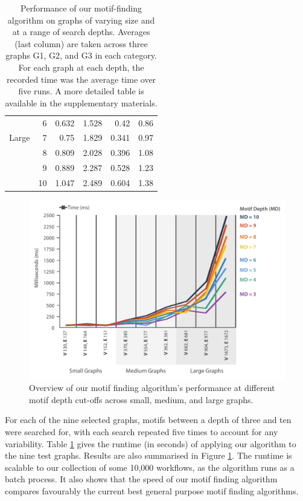 \begin{table}[t!]
{\begin{tabular}{|l|r|r|r|r|r|}
\multicolumn{ 1}{|l|}{} & 6 & 0.632 & 1.528 & 0.42 & 0.86 \\ \cline{ 2- 6}
\multicolumn{ 1}{|l|}{Large} & 7 & 0.75 & 1.829 & 0.341 & 0.97 \\ \cline{ 2- 6}
\multicolumn{ 1}{|l|}{} & 8 & 0.809 & 2.028 & 0.396 & 1.08 \\ \cline{ 2- 6}
\multicolumn{ 1}{|l|}{} & 9 & 0.889 & 2.287 & 0.528 & 1.23 \\ \cline{ 2- 6}
\multicolumn{ 1}{|l|}{} & 10 & 1.047 & 2.489 & 0.604 & 1.38 \\ \hline
\end{tabular}
}
\caption{Performance of our motif-finding algorithm on graphs of varying size and at a range of search depths. 
Averages (last column) are taken across three graphs G1, G2, and G3 in each category. 
For each graph at each depth, the recorded time was the average time over five runs. A more detailed table is available in the supplementary materials.}
\label{tab:performance}
\end{table}

\begin{figure}[ht!]
\centering
\includegraphics[width=.8\textwidth]{images/automacron/results_graph}
\caption{Overview of our motif finding algorithm's performance at different motif depth cut-offs across small, medium, and large graphs.}
\label{fig:eval_results_graph}
\end{figure}

For each of the nine selected graphs, motifs between a depth of three and ten were searched for, with each search repeated five times to account for any variability.
Table \ref{tab:performance} gives the runtime (in seconds) of applying our algorithm to the nine test graphs.
Results are also summarised in Figure \ref{fig:eval_results_graph}. 
The runtime is scalable to our collection of some 10,000 workflows, as the algorithm runs as a batch process.
It also shows that the speed of our motif finding algorithm compares favourably the current best general purpose motif finding algorithms.


